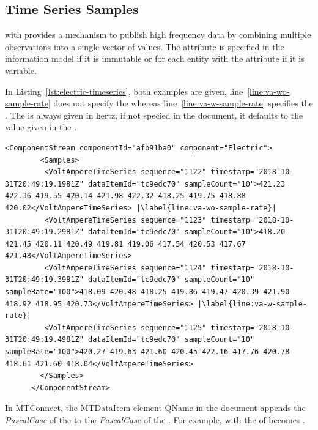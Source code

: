 \subsection{Time Series Samples}

 with   provides a mechanism to publish high frequency data by combining multiple observations into a single vector of values. The attribute  is specified in the  information model if it is immutable or for each entity with the attribute  if it is variable. 

In Listing~\ref{lst:electric-timeseries}, both examples are given, line~\ref{line:va-wo-sample-rate} does not specify the  whereas line~\ref{line:va-w-sample-rate} specifies the . The  is always given in hertz, if not specied in the  document, it defaults to the value given in the .

\begin{lstlisting}[firstnumber=last,escapechar=|,%
    caption={Electric Component Time Series Example},label={lst:electric-timeseries}]
      <ComponentStream componentId="afb91ba0" component="Electric">
        <Samples>
         <VoltAmpereTimeSeries sequence="1122" timestamp="2018-10-31T20:49:19.1981Z" dataItemId="tc9edc70" sampleCount="10">421.23 422.36 419.55 420.14 421.98 422.32 418.25 419.75 418.88 420.02</VoltAmpereTimeSeries> |\label{line:va-wo-sample-rate}|
         <VoltAmpereTimeSeries sequence="1123" timestamp="2018-10-31T20:49:19.2981Z" dataItemId="tc9edc70" sampleCount="10">418.20 421.45 420.11 420.49 419.81 419.06 417.54 420.53 417.67 421.48</VoltAmpereTimeSeries>
         <VoltAmpereTimeSeries sequence="1124" timestamp="2018-10-31T20:49:19.3981Z" dataItemId="tc9edc70" sampleCount="10" sampleRate="100">418.09 420.48 418.25 419.86 419.47 420.39 421.90 418.92 418.95 420.73</VoltAmpereTimeSeries> |\label{line:va-w-sample-rate}|
         <VoltAmpereTimeSeries sequence="1125" timestamp="2018-10-31T20:49:19.4981Z" dataItemId="tc9edc70" sampleCount="10" sampleRate="100">420.27 419.63 421.60 420.45 422.16 417.76 420.78 418.61 421.60 418.04</VoltAmpereTimeSeries>
        </Samples>
      </ComponentStream>
\end{lstlisting}

In MTConnect, the \gls{MTDataItem} element QName in the  document appends the \textit{PascalCase} of the  to the \textit{PascalCase} of the . For example,   with the  of  becomes . 

